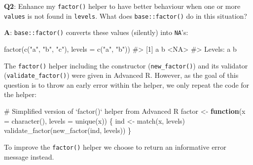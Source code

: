 \documentclass[
]{krantz}
\makeatletter
\newenvironment{Shaded}{\begin{snugshade}}{\end{snugshade}}
\newcommand{\CommentTok}[1]{\textcolor[rgb]{0.56,0.35,0.01}{\textit{#1}}}
\newcommand{\ControlFlowTok}[1]{\textcolor[rgb]{0.13,0.29,0.53}{\textbf{#1}}}
\newcommand{\DataTypeTok}[1]{\textcolor[rgb]{0.13,0.29,0.53}{#1}}
\newcommand{\KeywordTok}[1]{\textcolor[rgb]{0.13,0.29,0.53}{\textbf{#1}}}
\newcommand{\NormalTok}[1]{#1}
\newcommand{\StringTok}[1]{\textcolor[rgb]{0.31,0.60,0.02}{#1}}
\newenvironment{kframe}{%
\medskip{}
\setlength{\fboxsep}{.8em}
 \def\at@end@of@kframe{}%
 \ifinner\ifhmode%
  \def\at@end@of@kframe{\end{minipage}}%
  \begin{minipage}{\columnwidth}%
 \fi\fi%
 \def\FrameCommand##1{\hskip\@totalleftmargin \hskip-\fboxsep
 \colorbox{shadecolor}{##1}\hskip-\fboxsep
     \hskip-\linewidth \hskip-\@totalleftmargin \hskip\columnwidth}%
 \MakeFramed {\advance\hsize-\width
   \@totalleftmargin\z@ \linewidth\hsize
   \@setminipage}}%
 {\par\unskip\endMakeFramed%
 \at@end@of@kframe}
\renewenvironment{Shaded}{\begin{kframe}}{\end{kframe}}
\renewcommand{\KeywordTok} [1]{\textcolor[rgb]{0.00,0.44,0.13}{{#1}}}
\renewcommand{\DataTypeTok}[1]{\textcolor[rgb]{0.56,0.13,0.00}{{#1}}}
\renewcommand{\StringTok}  [1]{\textcolor[rgb]{0.25,0.44,0.63}{{#1}}}
\renewcommand{\CommentTok} [1]{\textcolor[rgb]{0.38,0.63,0.69}{{#1}}}
\renewcommand{\NormalTok}  [1]{{#1}}
\makeatother
\begin{document}
\textbf{{Q2}}: Enhance my \texttt{factor()} helper to have better behaviour when one or more \texttt{values} is not found in \texttt{levels}. What does \texttt{base::factor()} do in this situation?

\textbf{{A}}: \texttt{base::factor()} converts these values (silently) into \texttt{NA}'s:

\begin{Shaded}
\begin{Highlighting}[]
\KeywordTok{factor}\NormalTok{(}\KeywordTok{c}\NormalTok{(}\StringTok{"a"}\NormalTok{, }\StringTok{"b"}\NormalTok{, }\StringTok{"c"}\NormalTok{), }\DataTypeTok{levels =} \KeywordTok{c}\NormalTok{(}\StringTok{"a"}\NormalTok{, }\StringTok{"b"}\NormalTok{))}
\CommentTok{#> [1] a    b    <NA>}
\CommentTok{#> Levels: a b}
\end{Highlighting}
\end{Shaded}

The \texttt{factor()} helper including the constructor (\texttt{new\_factor()}) and its validator (\texttt{validate\_factor()}) were given in Advanced R. However, as the goal of this question is to throw an early error within the helper, we only repeat the code for the helper:

\begin{Shaded}
\begin{Highlighting}[]
\CommentTok{# Simplified version of `factor()` helper from Advanced R}
\NormalTok{factor <-}\StringTok{ }\ControlFlowTok{function}\NormalTok{(}\DataTypeTok{x =} \KeywordTok{character}\NormalTok{(), }\DataTypeTok{levels =} \KeywordTok{unique}\NormalTok{(x)) \{}
\NormalTok{  ind <-}\StringTok{ }\KeywordTok{match}\NormalTok{(x, levels)}
  \KeywordTok{validate_factor}\NormalTok{(}\KeywordTok{new_factor}\NormalTok{(ind, levels))}
\NormalTok{\}}
\end{Highlighting}
\end{Shaded}

To improve the \texttt{factor()} helper we choose to return an informative error message instead.
\end{document}
